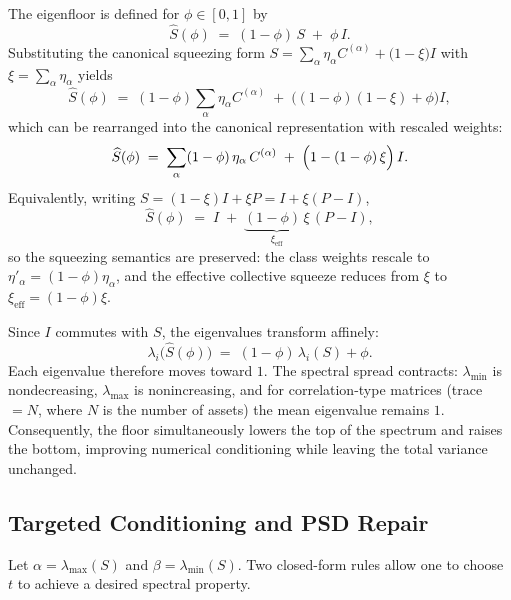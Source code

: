 \documentclass[12pt,letterpaper]{article}
\begin{document}
The eigenfloor is defined for \(\phi \in [0,1]\) by
\begin{equation}
\label{eq:eigfloor-def}
\widehat S(\phi) \;=\; (1-\phi)\,S \;+\; \phi\,I.
\end{equation}
Substituting the canonical squeezing form \(S=\sum_\alpha \eta_\alpha C^{(\alpha)} + \bigl(1-\xi\bigr)I\) with \(\xi=\sum_\alpha \eta_\alpha\) yields
\[
\widehat S(\phi) \;=\; (1-\phi)\sum_\alpha \eta_\alpha C^{(\alpha)} \;+\; \bigl((1-\phi)(1-\xi)+\phi\bigr)I,
\]
which can be rearranged into the canonical representation with rescaled weights:
\begin{equation}
\label{eq:eigfloor-canonical}
\widehat S(\phi) \;=\; \sum_\alpha (1-\phi)\,\eta_\alpha\,C^{(\alpha)} \;+\; \Bigl(1-(1-\phi)\,\xi\Bigr)\,I.
\end{equation}
Equivalently, writing \(S=(1-\xi)I+\xi P = I + \xi(P-I)\),
\begin{equation}
\label{eq:eigfloor-xieff}
\widehat S(\phi) \;=\; I \;+\; \underbrace{(1-\phi)\,\xi}_{\xi_{\text{eff}}}\,(P-I),
\end{equation}
so the squeezing semantics are preserved: the class weights rescale to \(\eta'_\alpha=(1-\phi)\eta_\alpha\), and the effective collective squeeze reduces from \(\xi\) to \(\xi_{\text{eff}}=(1-\phi)\xi\).

Since \(I\) commutes with \(S\), the eigenvalues transform affinely:
\begin{equation}
\label{eq:eigfloor-map}
\lambda_i\bigl(\widehat S(\phi)\bigr) \;=\; (1-\phi)\,\lambda_i(S)+\phi.
\end{equation}
Each eigenvalue therefore moves toward \(1\). The spectral spread contracts: \(\lambda_{\min}\) is nondecreasing, \(\lambda_{\max}\) is nonincreasing, and for correlation-type matrices (trace \(=N\), where $N$ is the number of assets) the mean eigenvalue remains \(1\). Consequently, the floor simultaneously lowers the top of the spectrum and raises the bottom, improving numerical conditioning while leaving the total variance unchanged.

\subsection{Targeted Conditioning and PSD Repair}

Let \(\alpha=\lambda_{\max}(S)\) and \(\beta=\lambda_{\min}(S)\). Two closed-form rules allow one to choose \(t\) to achieve a desired spectral property.
\end{document}
